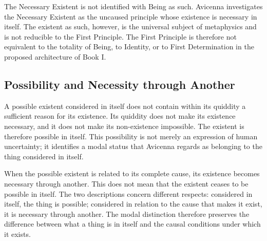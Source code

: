 \label{para:VS.B01.P01.C08.S13.SS07.P004}

The Necessary Existent is not
identified with Being as such.
Avicenna investigates the
Necessary Existent as the
uncaused principle whose
existence is necessary in
itself. The existent as such,
however, is the universal
subject of metaphysics and
is not reducible to the
First Principle. The First
Principle is therefore not
equivalent to the totality
of Being, to Identity, or
to First Determination in
the proposed architecture
of Book I.
\citep[Ilahiyyat, I.1--3 and VIII.4]{AvicennaMetaphysics}



\subsection{Possibility and Necessity through Another}
\label{subsec:ch08-avicenna-possibility-necessity}

\label{para:VS.B01.P01.C08.S13.SS08.P001}

A possible existent considered
in itself does not contain
within its quiddity a sufficient
reason for its existence.
Its quiddity does not make
its existence necessary,
and it does not make its
non-existence impossible.
The existent is therefore
possible in itself. This
possibility is not merely
an expression of human
uncertainty; it identifies
a modal status that Avicenna
regards as belonging to
the thing considered in
itself.
\citep[Ilahiyyat, I.6]{AvicennaMetaphysics}

\label{para:VS.B01.P01.C08.S13.SS08.P002}

When the possible existent
is related to its complete
cause, its existence becomes
necessary through another.
This does not mean that
the existent ceases to be
possible in itself. The
two descriptions concern
different respects: considered
in itself, the thing is
possible; considered in
relation to the cause
that makes it exist, it
is necessary through
another. The modal
distinction therefore
preserves the difference
between what a thing is
in itself and the causal
conditions under which
it exists.
\citep[Ilahiyyat, I.6 and VIII.1--3]{AvicennaMetaphysics}

